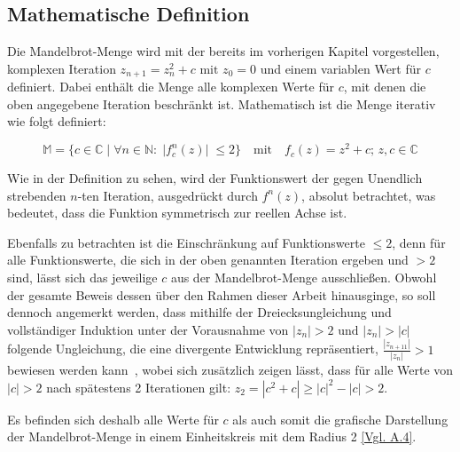 \subsection{Mathematische Definition}\label{subsec:mathematical-definition}

Die Mandelbrot-Menge wird mit der bereits im vorherigen Kapitel vorgestellen,
komplexen Iteration $z_{n+1} = z_n^2 + c \text{ mit } z_0 = 0$ und einem variablen
Wert für $c$~\cite*[S.25]{schuh_fraktale_2017} definiert.
Dabei enthält die Menge alle komplexen Werte für $c$, mit denen die
oben angegebene Iteration beschränkt ist.
Mathematisch ist die Menge iterativ wie folgt definiert:

\begin{equation}\label{eq:mathematical-definition}
  \mathbb{M} = \{c \in \mathbb{C} \; |\;  \forall n \in \mathbb{N}:\; |f_c^n(z)|\; \leqslant 2\}
  \quad
  \text{mit}
  \quad
  f_c(z) = z^2 + c;\, z,c \in \mathbb{C}
\end{equation}

Wie in der Definition zu sehen, wird der Funktionswert der
gegen Unendlich strebenden $n$-ten Iteration, ausgedrückt durch $f^n(z)$,
absolut betrachtet, was bedeutet, dass die Funktion symmetrisch zur reellen Achse ist.

Ebenfalls zu betrachten ist die Einschränkung auf Funktionswerte $\leqslant 2$, denn
für alle Funktionswerte, die sich in der oben genannten Iteration ergeben
und $> 2$ sind, lässt sich das jeweilige $c$ aus der Mandelbrot-Menge
ausschließen.
Obwohl der gesamte Beweis dessen über den Rahmen dieser Arbeit hinausginge,
so soll dennoch angemerkt werden, dass mithilfe der Dreiecksungleichung und
vollständiger Induktion unter der Vorausnahme von $|z_n| > 2 \text{ und } |z_n| > |c|$
folgende Ungleichung, die eine divergente Entwicklung repräsentiert,
$\frac{|z_{n+11}|}{|z_n|} > 1$ bewiesen werden kann~\cite{munafo_escape_1997},
wobei sich zusätzlich zeigen lässt, dass für alle Werte von $|c| > 2$
nach spätestens 2 Iterationen gilt: $z_2 = |c^2 + c| \geqslant |c|^2 - |c| > 2$.

Es befinden sich deshalb alle Werte für $c$ als auch somit die grafische Darstellung
der Mandelbrot-Menge in einem Einheitskreis mit dem Radius 2 \hyperref[app:4]{[Vgl. A.4]}.